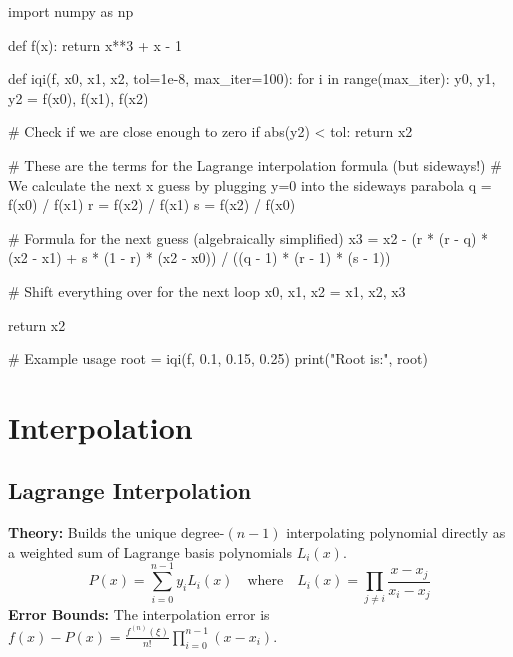 \documentclass{article}
\begin{document}
\begin{jupytercode}
import numpy as np

def f(x):
    return x**3 + x - 1

def iqi(f, x0, x1, x2, tol=1e-8, max_iter=100):
    for i in range(max_iter):
        y0, y1, y2 = f(x0), f(x1), f(x2)
        
        # Check if we are close enough to zero
        if abs(y2) < tol:
            return x2
            
        # These are the terms for the Lagrange interpolation formula (but sideways!)
        # We calculate the next x guess by plugging y=0 into the sideways parabola
        q = f(x0) / f(x1)
        r = f(x2) / f(x1)
        s = f(x2) / f(x0)
        
        # Formula for the next guess (algebraically simplified)
        x3 = x2 - (r * (r - q) * (x2 - x1) + s * (1 - r) * (x2 - x0)) / ((q - 1) * (r - 1) * (s - 1))
        
        # Shift everything over for the next loop
        x0, x1, x2 = x1, x2, x3
        
    return x2

# Example usage
root = iqi(f, 0.1, 0.15, 0.25)
print("Root is:", root)
\end{jupytercode}
\newpage


\section{Interpolation}

\subsection{Lagrange Interpolation}
\textbf{Theory:} Builds the unique degree-$(n-1)$ interpolating polynomial directly as a weighted sum of Lagrange basis polynomials $L_i(x)$.
\begin{equation*}
P(x) = \sum_{i=0}^{n-1} y_i L_i(x) \quad \text{where} \quad L_i(x) = \prod_{j \neq i} \frac{x - x_j}{x_i - x_j}
\end{equation*}
\textbf{Error Bounds:} The interpolation error is $f(x) - P(x) = \frac{f^{(n)}(\xi)}{n!} \prod_{i=0}^{n-1} (x - x_i)$.
\end{document}
